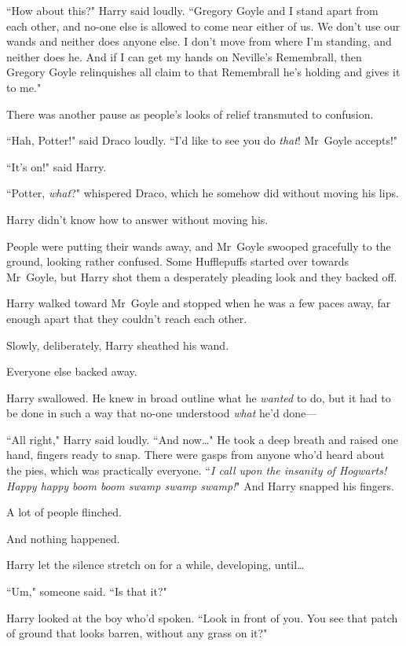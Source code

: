 ``How about this?" Harry said loudly. ``Gregory Goyle and I stand apart from each other, and no-one else is allowed to come near either of us. We don't use our wands and neither does anyone else. I don't move from where I'm standing, and neither does he. And if I can get my hands on Neville's Remembrall, then Gregory Goyle relinquishes all claim to that Remembrall he's holding and gives it to me."

There was another pause as people's looks of relief transmuted to confusion.

``Hah, Potter!" said Draco loudly. ``I'd like to see you do \emph{that}! Mr~Goyle accepts!"

``It's on!" said Harry.

``Potter, \emph{what}?" whispered Draco, which he somehow did without moving his lips.

Harry didn't know how to answer without moving his.

People were putting their wands away, and Mr~Goyle swooped gracefully to the ground, looking rather confused. Some Hufflepuffs started over towards Mr~Goyle, but Harry shot them a desperately pleading look and they backed off.

Harry walked toward Mr~Goyle and stopped when he was a few paces away, far enough apart that they couldn't reach each other.

Slowly, deliberately, Harry sheathed his wand.

Everyone else backed away.

Harry swallowed. He knew in broad outline what he \emph{wanted} to do, but it had to be done in such a way that no-one understood \emph{what} he'd done—

``All right," Harry said loudly. ``And now…" He took a deep breath and raised one hand, fingers ready to snap. There were gasps from anyone who'd heard about the pies, which was practically everyone. ``\emph{I call upon the insanity of Hogwarts! Happy happy boom boom swamp swamp swamp!}" And Harry snapped his fingers.

A lot of people flinched.

And nothing happened.

Harry let the silence stretch on for a while, developing, until…

``Um," someone said. ``Is that it?"

Harry looked at the boy who'd spoken. ``Look in front of you. You see that patch of ground that looks barren, without any grass on it?"

